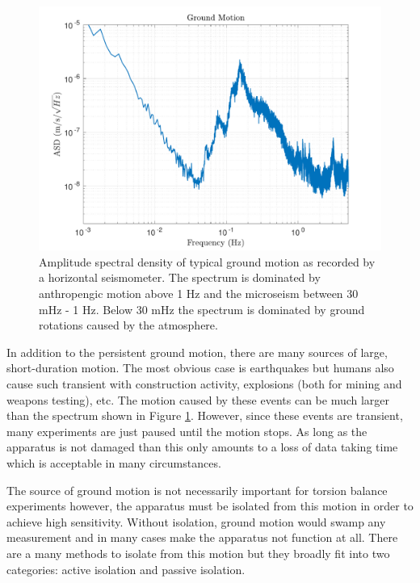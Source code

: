 \documentclass{book}
\begin{document}
\begin{figure}[!h]
\begin{centering}
\includegraphics[width=\textwidth]{GroundSpectrum.pdf}
\caption{Amplitude spectral density of typical ground motion as recorded by a horizontal seismometer. \cite{ross2020precision} The spectrum is dominated by anthropengic motion above 1 Hz and the microseism between 30 mHz - 1 Hz. Below 30 mHz the spectrum is dominated by ground rotations caused by the atmosphere.}\label{groundSpec}
\end{centering}
\end{figure}

In addition to the persistent ground motion, there are many sources of large, short-duration motion. The most obvious case is earthquakes but humans also cause such transient with construction activity, explosions (both for mining and weapons testing), etc. The motion caused by these events can be much larger than the spectrum shown in Figure \ref{groundSpec}. However, since these events are transient, many experiments are just paused until the motion stops. As long as the apparatus is not damaged than this only amounts to a loss of data taking time which is acceptable in many circumstances.

The source of ground motion is not necessarily important for torsion balance experiments however, the apparatus must be isolated from this motion in order to achieve high sensitivity. Without isolation, ground motion would swamp any measurement and in many cases make the apparatus not function at all. There are a many methods to isolate from this motion but they broadly fit into two categories: active isolation and passive isolation. 
\end{document}
